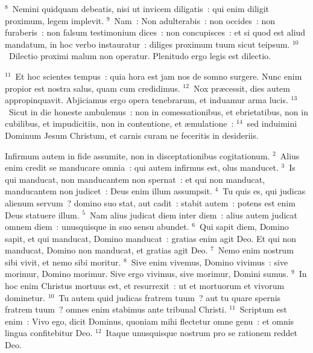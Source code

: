 ${}^{8}$~Nemini quidquam debeatis, nisi ut invicem diligatis~: qui enim diligit proximum, legem implevit.
${}^{9}$~Nam~: Non adulterabis~: non occides~: non furaberis~: non falsum testimonium dices~: non concupisces~: et si quod est aliud mandatum, in hoc verbo instauratur~: diliges proximum tuum sicut teipsum.
${}^{10}$~Dilectio proximi malum non operatur. Plenitudo ergo legis est dilectio.


${}^{11}$~Et hoc scientes tempus~: quia hora est jam nos de somno surgere. Nunc enim propior est nostra salus, quam cum credidimus.
${}^{12}$~Nox pr\ae cessit, dies autem appropinquavit. Abjiciamus ergo opera tenebrarum, et induamur arma lucis.
${}^{13}$~Sicut in die honeste ambulemus~: non in comessationibus, et ebrietatibus, non in cubilibus, et impudicitiis, non in contentione, et \ae mulatione~:
${}^{14}$~sed induimini Dominum Jesum Christum, et carnis curam ne feceritis in desideriis.

\lettrine[lines=3,image=true,loversize=0.05,lraise=-0.03]{I}{}nfirmum autem in fide assumite, non in disceptationibus cogitationum.
${}^{2}$~Alius enim credit se manducare omnia~: qui autem infirmus est, olus manducet.
${}^{3}$~Is qui manducat, non manducantem non spernat~: et qui non manducat, manducantem non judicet~: Deus enim illum assumpsit.
${}^{4}$~Tu quis es, qui judicas alienum servum~? domino suo stat, aut cadit~: stabit autem~: potens est enim Deus statuere illum.
${}^{5}$~Nam alius judicat diem inter diem~: alius autem judicat omnem diem~: unusquisque in suo sensu abundet.
${}^{6}$~Qui sapit diem, Domino sapit, et qui manducat, Domino manducat~: gratias enim agit Deo. Et qui non manducat, Domino non manducat, et gratias agit Deo.
${}^{7}$~Nemo enim nostrum sibi vivit, et nemo sibi moritur.
${}^{8}$~Sive enim vivemus, Domino vivimus~: sive morimur, Domino morimur. Sive ergo vivimus, sive morimur, Domini sumus.
${}^{9}$~In hoc enim Christus mortuus est, et resurrexit~: ut et mortuorum et vivorum dominetur.
${}^{10}$~Tu autem quid judicas fratrem tuum~? aut tu quare spernis fratrem tuum~? omnes enim stabimus ante tribunal Christi.
${}^{11}$~Scriptum est enim~: Vivo ego, dicit Dominus, quoniam mihi flectetur omne genu~: et omnis lingua confitebitur Deo.
${}^{12}$~Itaque unusquisque nostrum pro se rationem reddet Deo.



